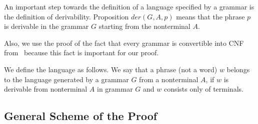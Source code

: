 

An important step towards the definition of a language specified by a grammar is the definition of derivability. Proposition $der(G, A, p)$ means that the phrase $p$ is derivable in the grammar $G$ starting from the nonterminal $A$.


Also, we use the proof of the fact that every grammar is convertible into CNF from~\cite{smolkaHofmann2016} because this fact is important for our proof.

We define the language as follows. We say that a phrase (not a word) $ w $ belongs to the language generated by a grammar $G$ from a nonterminal $A$, if $ w $ is derivable from nonterminal $ A $ in grammar $ G $ and $ w $ consists only of terminals.




\subsection{General Scheme of the Proof}

